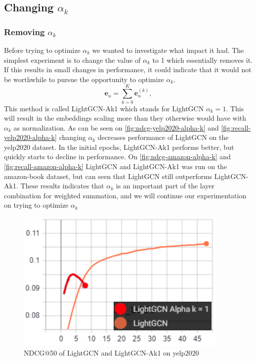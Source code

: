 \subsection{Changing $\alpha_k$}

\subsubsection{Removing $\alpha_k$}\label{subsubsec:remove-alpha-k}
Before trying to optimize $\alpha_k$ we wanted to investigate what impact it had.
The simplest experiment is to change the value of $\alpha_k$ to 1 which essentially removes it.
If this results in small changes in performance, it could indicate that it would not be worthwhile to pursue the opportunity to optimize $\alpha_k$.
\begin{equation}
    \mathbf{e}_u = \sum_{k=0}^{K} \mathbf{e}_u^{(k)},
    \label{eq:lightgcn-sum}
\end{equation}
This method is called LightGCN-Ak1 which stands for LightGCN $\alpha_k = 1$.
This will result in the embeddings scaling more than they otherwise would have with $\alpha_k$ as normalization.
As can be seen on \autoref{fig:ndcg-yelp2020-alpha-k} and \autoref{fig:recall-yelp2020-alpha-k} changing $\alpha_k$ decreases performance of LightGCN on the yelp2020 dataset.
In the initial epochs, LightGCN-Ak1 performs better, but quickly starts to decline in performance.
On \autoref{fig:ndcg-amazon-alpha-k} and \autoref{fig:recall-amazon-alpha-k} LightGCN and LightGCN-Ak1 was run on the amazon-book dataset, but can seen that LightGCN still outperforms LightGCN-Ak1.
These results indicates that $\alpha_k$ is an important part of the layer combination for weighted summation, and we will continue our experimentation on trying to optimize $\alpha_k$
\begin{figure}
    \includegraphics[width=\linewidth]{figures/alpha-k-results/yelp2020-ndcg.png}
    \caption{NDCG@50 of LightGCN and LightGCN-Ak1 on yelp2020}
    \label{fig:ndcg-yelp2020-alpha-k}
\end{figure}

